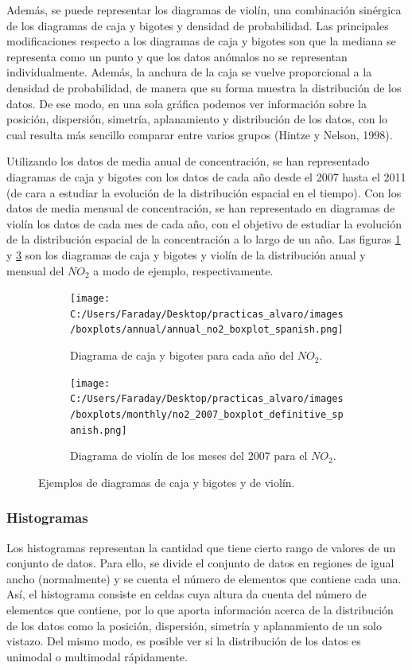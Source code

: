 \documentclass[12pt]{article}
\begin{document}
Además, se puede representar los diagramas de violín, una combinación sinérgica de los diagramas de caja y bigotes y densidad de probabilidad. Las principales modificaciones respecto a los diagramas de caja y bigotes son que la mediana se representa como un punto y que los datos anómalos no se representan individualmente. Además, la anchura de la caja se vuelve proporcional a la densidad de probabilidad, de manera que su forma muestra la distribución de los datos. De ese modo, en una sola gráfica podemos ver información sobre la posición, dispersión, simetría, aplanamiento y distribución de los datos, con lo cual resulta más sencillo comparar entre varios grupos (Hintze y Nelson, 1998).

Utilizando los datos de media anual de concentración, se han representado diagramas de caja y bigotes con los datos de cada año desde el 2007 hasta el 2011 (de cara a estudiar la evolución de la distribución espacial en el tiempo). Con los datos de media mensual de concentración, se han representado en diagramas de violín los datos de cada mes de cada año, con el objetivo de estudiar la evolución de la distribución espacial de la concentración a lo largo de un año. Las figuras \ref{fig:box-ejem-1} y \ref{fig:box-ejem-2} son los diagramas de caja y bigotes y violín de la distribución anual y mensual del $NO_{2}$ a modo de ejemplo, respectivamente.

\begin{figure}[H]
\centering
\begin{subfigure}[H]{0.45\textwidth}
\texttt{[image: C:/Users/Faraday/Desktop/practicas\_alvaro/images/boxplots/annual/annual\_no2\_boxplot\_spanish.png]}
\caption{Diagrama de caja y bigotes para cada año del $NO_{2}$.}
\label{fig:box-ejem-1}
\end{subfigure}
%
\begin{subfigure}[H]{0.45\textwidth}
\texttt{[image: C:/Users/Faraday/Desktop/practicas\_alvaro/images/boxplots/monthly/no2\_2007\_boxplot\_definitive\_spanish.png]}
\caption{Diagrama de violín de los meses del 2007 para el $NO_{2}$.}
\label{fig:box-ejem-2}
\end{subfigure}
\caption{Ejemplos de diagramas de caja y bigotes y de violín.}
\end{figure}

\subsubsection{Histogramas}

Los histogramas representan la cantidad que tiene cierto rango de valores de un conjunto de datos. Para ello, se divide el conjunto de datos en regiones de igual ancho (normalmente) y se cuenta el número de elementos que contiene cada una. Así, el histograma consiste en celdas cuya altura da cuenta del número de elementos que contiene, por lo que aporta información acerca de la distribución de los datos como la posición, dispersión, simetría y aplanamiento de un solo vistazo. Del mismo modo, es posible ver si la distribución de los datos es unimodal o multimodal rápidamente.
\end{document}
